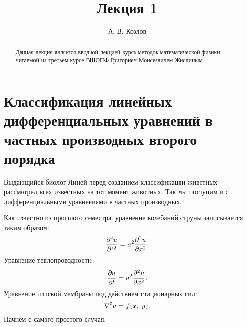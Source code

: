 \documentclass[a4paper,russian]{article}
\title{Лекция 1}
\author{А. В. Козлов}
\begin{document}
\maketitle
\begin{abstract}
Данная лекция является вводной лекцией курса методов математической физики, читаемой на третьем курсе ВШОПФ Григорием Моисеевичем Жислиным.
\end{abstract}
\section{Классификация линейных дифференциальных уравнений в частных производных второго порядка}
Выдающийся биолог Линей перед созданием классификации животных рассмотрел всех известных на тот момент животных.
Так мы поступим и с дифференциальными уравнениями в частных производных.\par
Как известно из прошлого семестра\cite{enabla_lec}, уравнение колебаний струны записывается таким образом:
\[
	\pdv[2]{u}{t} = a^2\pdv[2]{u}{x}
.\]
Уравнение теплопроводности:
\[
	\pdv{u}{t}=a^2\pdv[2]{u}{x}
.\] 
Уравнение плоской мембраны под действием стационарных сил:
\[
	\laplacian{u} = f\qty(x,\ y)
.\]
Начнём с самого простого случая.
\end{document}
